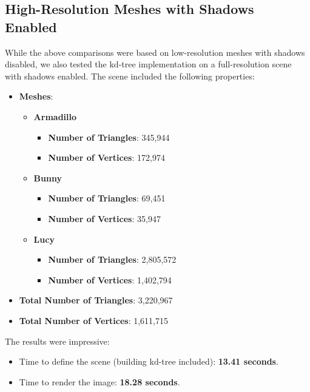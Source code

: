 \documentclass[unicode,11pt,a4paper,oneside,numbers=endperiod,openany]{scrartcl}
\begin{document}
\subsection{High-Resolution Meshes with Shadows Enabled}
While the above comparisons were based on low-resolution meshes with shadows disabled, we also tested the kd-tree implementation on a full-resolution scene with shadows enabled. The scene included the following properties:
\begin{itemize}
    \item \textbf{Meshes}:
          \begin{itemize}
              \item \textbf{Armadillo}
                    \begin{itemize}
                        \item \textbf{Number of Triangles}: 345,944
                        \item \textbf{Number of Vertices}: 172,974
                    \end{itemize}
              \item \textbf{Bunny}
                    \begin{itemize}
                        \item \textbf{Number of Triangles}: 69,451
                        \item \textbf{Number of Vertices}: 35,947
                    \end{itemize}
              \item \textbf{Lucy}
                    \begin{itemize}
                        \item \textbf{Number of Triangles}: 2,805,572
                        \item \textbf{Number of Vertices}: 1,402,794
                    \end{itemize}
          \end{itemize}
    \item \textbf{Total Number of Triangles}: 3,220,967
    \item \textbf{Total Number of Vertices}: 1,611,715
\end{itemize}

The results were impressive:
\begin{itemize}
    \item Time to define the scene (building kd-tree included): \textbf{13.41 seconds}.
    \item Time to render the image: \textbf{18.28 seconds}.
\end{itemize}
\end{document}
